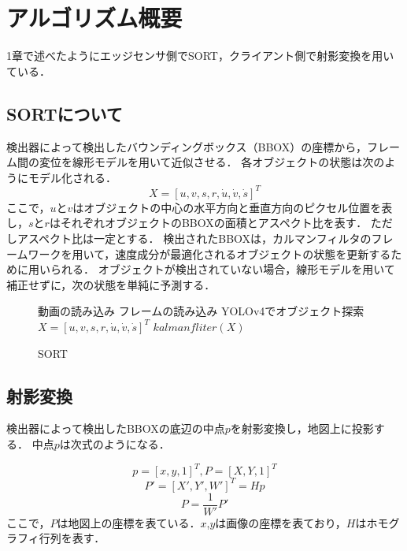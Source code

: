 \documentclass[technicalreport]{ieicej}
\begin{document}
\section{アルゴリズム概要}
1章で述べたようにエッジセンサ側でSORT，クライアント側で射影変換を用いている．

\subsection{SORTについて}
検出器によって検出したバウンディングボックス（BBOX）の座標から，フレーム間の変位を線形モデルを用いて近似させる．
各オブジェクトの状態は次のようにモデル化される．
\begin{equation}
  X = [u, v, s, r, \dot{u} , \dot{v} , \dot{s}]^T
\end{equation}
ここで，$u$と$v$はオブジェクトの中心の水平方向と垂直方向のピクセル位置を表し，$s$と$r$はそれぞれオブジェクトのBBOXの面積とアスペクト比を表す．
ただしアスペクト比は一定とする．
検出されたBBOXは，カルマンフィルタのフレームワークを用いて，速度成分が最適化されるオブジェクトの状態を更新するために用いられる．
オブジェクトが検出されていない場合，線形モデルを用いて補正せずに，次の状態を単純に予測する．

\begin{figure}[!t]
  \begin{algorithm}[H]
      \caption{SORT}
      \label{alg1}
      \begin{algorithmic}[1]
      \STATE 動画の読み込み
      \WHILE{}
      \STATE フレームの読み込み
      \STATE YOLOv4でオブジェクト探索
      \STATE $X = [u, v, s, r, \dot{u} , \dot{v} , \dot{s}]^T$ 
      \STATE $kalmanfliter(X)$
      \ENDIF
      \ENDWHILE
      \end{algorithmic}
  \end{algorithm}
  \end{figure}

\subsection{射影変換}
検出器によって検出したBBOXの底辺の中点$p$を射影変換し，地図上に投影する．
中点$p$は次式のようになる．

\begin{equation}
  p = [x, y, 1]^T, P = [X, Y, 1]^T
\end{equation}
\begin{equation}
  P' = [X', Y', W']^T = Hp
\end{equation}
\begin{equation}
  P = \frac{1}{W'}P'
\end{equation}
ここで，$P$は地図上の座標を表ている．$x$,$y$は画像の座標を表ており，$H$はホモグラフィ行列を表す．
\end{document}
